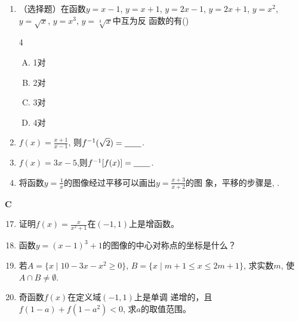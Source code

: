 \begin{enumerate}
\item （选择题）在函数$y= x- 1$, $y= x+ 1$,  $y= 2x- 1$, $y=2x+1$, $y=x^{2}$, $y=\sqrt{x}$, $y=x^{3}$, $y=\sqrt[{3}]{x}$中互为反
函数的有(\quad)
\begin{multicols}{4}
    \begin{enumerate}[(A)]
        \item 1对
        \item 2对
        \item 3对
        \item 4对
    \end{enumerate}
    \end{multicols}

\item $f(x)=\frac{x+1}{x-1}$, 则$f^{-1}(\sqrt{2})=\underline{\qquad}$.

\item $f(x)=3x-5$,则$f^{-1}[f(x)]=\underline{\qquad}$.

\item 将函数$y=\frac{1}{x}$的图像经过平移可以画出$y=\frac{x+3}{x+2}$的图
象，平移的步骤是\blank, \blank.
\end{enumerate}

\begin{center}
    \bfseries C
\end{center}

\begin{enumerate}\setcounter{enumi}{16}
\item 证明$f(x)=\frac x{x^2+1}$在$(-1,1)$上是增函数。

\item  函数$y=(x-1)^3+1$的图像的中心对称点的坐标是什么？ 
\item 若$A=\{x\mid 10-3x-x^{2}\ge 0\}$, $B=\{x\mid m+1\leq x\leq 2m+1\}$, 
求实数$m$, 使$A\cap B\neq\emptyset$.
\item 奇函数$f(x)$在定义域$(-1,1)$上是单调 递增的，且
$f\left(1-a\right)+f\left(1-a^2\right)<0$, 求$a$的取值范围。
\end{enumerate}














